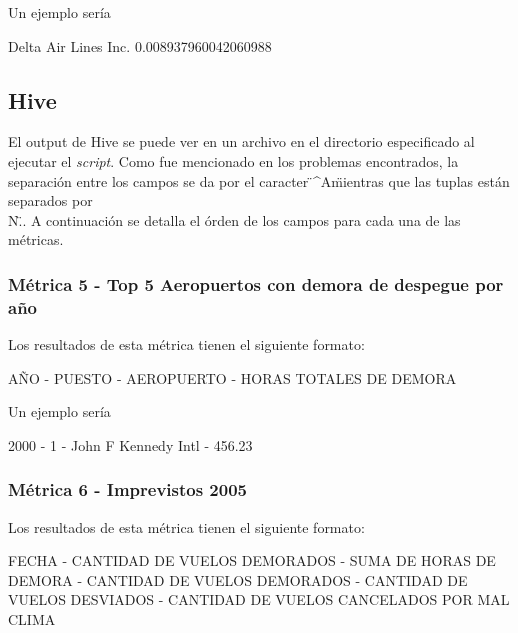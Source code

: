 \documentclass[a4paper,10pt]{article}
\begin{document}
            Un ejemplo sería\\
            \begin{center}
               Delta Air Lines Inc.    0.008937960042060988\\
            \end{center}

        \subsection{Hive}
        El output de Hive se puede ver en un archivo en el directorio especificado al ejecutar el \textit{script}. Como fue mencionado en los problemas encontrados, la separación entre los campos se da por el caracter \"^A\" mientras que las tuplas están separados por \"\\N\"..
        A continuación se detalla el órden de los campos para cada una de las métricas.
        \subsubsection{Métrica 5 - Top 5 Aeropuertos con demora de despegue por año}
        Los resultados de esta métrica tienen el siguiente formato:\\
            \begin{center}
                AÑO - PUESTO - AEROPUERTO - HORAS TOTALES DE DEMORA\\
            \end{center}

            Un ejemplo sería\\
            \begin{center}
               2000 - 1 - John F Kennedy Intl - 456.23\\
            \end{center}
        \subsubsection{Métrica 6 - Imprevistos 2005}
            Los resultados de esta métrica tienen el siguiente formato:\\
            \begin{center}
                FECHA - CANTIDAD DE VUELOS DEMORADOS - SUMA DE HORAS DE DEMORA - CANTIDAD DE VUELOS DEMORADOS - CANTIDAD DE VUELOS DESVIADOS - CANTIDAD DE VUELOS CANCELADOS POR MAL CLIMA\\
            \end{center}
\end{document}
